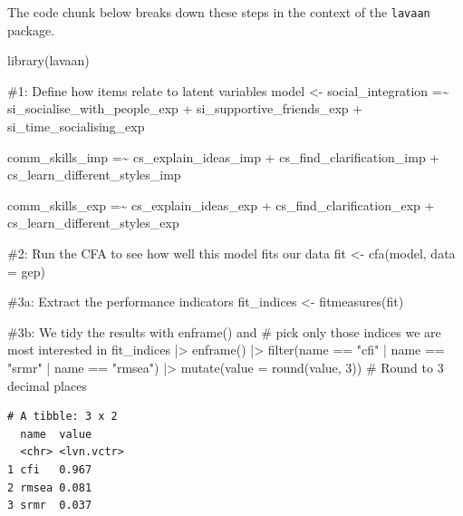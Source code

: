 \documentclass[
  letterpaper,
  DIV=11,
  numbers=noendperiod]{scrreprt}
\newenvironment{Shaded}{\begin{snugshade}}{\end{snugshade}}
\newcommand{\AttributeTok}[1]{\textcolor[rgb]{0.40,0.45,0.13}{#1}}
\newcommand{\CommentTok}[1]{\textcolor[rgb]{0.37,0.37,0.37}{#1}}
\newcommand{\DecValTok}[1]{\textcolor[rgb]{0.68,0.00,0.00}{#1}}
\newcommand{\FunctionTok}[1]{\textcolor[rgb]{0.28,0.35,0.67}{#1}}
\newcommand{\NormalTok}[1]{\textcolor[rgb]{0.00,0.23,0.31}{#1}}
\newcommand{\OtherTok}[1]{\textcolor[rgb]{0.00,0.23,0.31}{#1}}
\newcommand{\SpecialCharTok}[1]{\textcolor[rgb]{0.37,0.37,0.37}{#1}}
\newcommand{\StringTok}[1]{\textcolor[rgb]{0.13,0.47,0.30}{#1}}
\begin{document}
The code chunk below breaks down these steps in the context of the
\texttt{lavaan} package.

\begin{Shaded}
\begin{Highlighting}[]
\FunctionTok{library}\NormalTok{(lavaan)}

\CommentTok{\#1: Define how items relate to latent variables}
\NormalTok{model }\OtherTok{\textless{}{-}} \StringTok{\textquotesingle{}}
\StringTok{social\_integration =\textasciitilde{}}
\StringTok{si\_socialise\_with\_people\_exp +}
\StringTok{si\_supportive\_friends\_exp +}
\StringTok{si\_time\_socialising\_exp}

\StringTok{comm\_skills\_imp =\textasciitilde{}}
\StringTok{cs\_explain\_ideas\_imp +}
\StringTok{cs\_find\_clarification\_imp +}
\StringTok{cs\_learn\_different\_styles\_imp}

\StringTok{comm\_skills\_exp =\textasciitilde{}}
\StringTok{cs\_explain\_ideas\_exp +}
\StringTok{cs\_find\_clarification\_exp +}
\StringTok{cs\_learn\_different\_styles\_exp}
\StringTok{\textquotesingle{}}

\CommentTok{\#2: Run the CFA to see how well this model fits our data}
\NormalTok{fit }\OtherTok{\textless{}{-}} \FunctionTok{cfa}\NormalTok{(model, }\AttributeTok{data =}\NormalTok{ gep)}

\CommentTok{\#3a: Extract the performance indicators}
\NormalTok{fit\_indices }\OtherTok{\textless{}{-}} \FunctionTok{fitmeasures}\NormalTok{(fit)}

\CommentTok{\#3b: We tidy the results with enframe() and}
\CommentTok{\#    pick only those indices we are most interested in}
\NormalTok{fit\_indices }\SpecialCharTok{|\textgreater{}}
  \FunctionTok{enframe}\NormalTok{() }\SpecialCharTok{|\textgreater{}}
  \FunctionTok{filter}\NormalTok{(name }\SpecialCharTok{==} \StringTok{"cfi"} \SpecialCharTok{|}
\NormalTok{         name }\SpecialCharTok{==} \StringTok{"srmr"} \SpecialCharTok{|}
\NormalTok{         name }\SpecialCharTok{==} \StringTok{"rmsea"}\NormalTok{) }\SpecialCharTok{|\textgreater{}}
  \FunctionTok{mutate}\NormalTok{(}\AttributeTok{value =} \FunctionTok{round}\NormalTok{(value, }\DecValTok{3}\NormalTok{))   }\CommentTok{\# Round to 3 decimal places}
\end{Highlighting}
\end{Shaded}

\begin{verbatim}
# A tibble: 3 x 2
  name  value     
  <chr> <lvn.vctr>
1 cfi   0.967     
2 rmsea 0.081     
3 srmr  0.037     
\end{verbatim}
\end{document}
